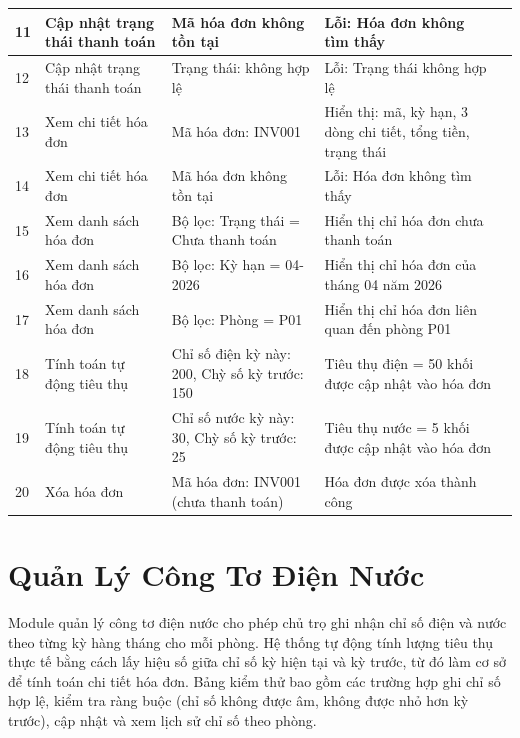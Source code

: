 \documentclass[12pt,a4paper]{article}
\begin{document}
\begin{table}[h!]
\begin{small}
\begin{tabularx}{\textwidth}{|p{0.8cm}|p{2.5cm}|p{3cm}|p{3cm}|p{2.5cm}|}
    11 & Cập nhật trạng thái thanh toán & Mã hóa đơn không tồn tại & Lỗi: Hóa đơn không tìm thấy & \\ \hline

    12 & Cập nhật trạng thái thanh toán & Trạng thái: không hợp lệ & Lỗi: Trạng thái không hợp lệ & \\ \hline

    13 & Xem chi tiết hóa đơn & Mã hóa đơn: INV001 & Hiển thị: mã, kỳ hạn, 3 dòng chi tiết, tổng tiền, trạng thái & \\ \hline

    14 & Xem chi tiết hóa đơn & Mã hóa đơn không tồn tại & Lỗi: Hóa đơn không tìm thấy & \\ \hline

    15 & Xem danh sách hóa đơn & Bộ lọc: Trạng thái = Chưa thanh toán & Hiển thị chỉ hóa đơn chưa thanh toán & \\ \hline

    16 & Xem danh sách hóa đơn & Bộ lọc: Kỳ hạn = 04-2026 & Hiển thị chỉ hóa đơn của tháng 04 năm 2026 & \\ \hline

    17 & Xem danh sách hóa đơn & Bộ lọc: Phòng = P01 & Hiển thị chỉ hóa đơn liên quan đến phòng P01 & \\ \hline

    18 & Tính toán tự động tiêu thụ & Chỉ số điện kỳ này: 200, Chỳ số kỳ trước: 150 & Tiêu thụ điện = 50 khối được cập nhật vào hóa đơn & \\ \hline

    19 & Tính toán tự động tiêu thụ & Chỉ số nước kỳ này: 30, Chỳ số kỳ trước: 25 & Tiêu thụ nước = 5 khối được cập nhật vào hóa đơn & \\ \hline

    20 & Xóa hóa đơn & Mã hóa đơn: INV001 (chưa thanh toán) & Hóa đơn được xóa thành công & \\ \hline

    \end{tabularx}
    \end{small}
\end{table}
    
\newpage

\section{Quản Lý Công Tơ Điện Nước}

Module quản lý công tơ điện nước cho phép chủ trọ ghi nhận chỉ số điện và nước theo từng kỳ hàng tháng cho mỗi phòng. Hệ thống tự động tính lượng tiêu thụ thực tế bằng cách lấy hiệu số giữa chỉ số kỳ hiện tại và kỳ trước, từ đó làm cơ sở để tính toán chi tiết hóa đơn. Bảng kiểm thử bao gồm các trường hợp ghi chỉ số hợp lệ, kiểm tra ràng buộc (chỉ số không được âm, không được nhỏ hơn kỳ trước), cập nhật và xem lịch sử chỉ số theo phòng.
\end{document}
